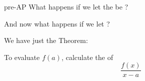 \begin{taggedblock}{pre-AP}
What happens if we let the  be ?
\vspace{1in}

And now
what happens if we let ?
\vspace{1in}

We have just  the  Theorem:

\begin{myCenteredBox}[width=4.75in]
    To evaluate $f(a)$, calculate the  of 
    \large
    \begin{equation*}
        \frac{f(x)}{x-a}
    \end{equation*}
\end{myCenteredBox}


\end{taggedblock}